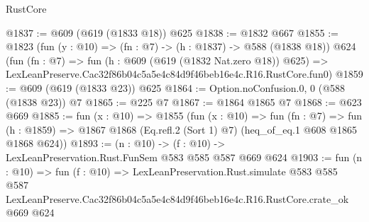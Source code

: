 \begin{lexlean}{RustCore}
\begin{coremodule}
@1837 := @609 (@619 (@1833 @18)) @625
@1838 := @1832 @667
@1855 := @1823
    (fun (y : @10) => (fn : @7) -> (h : @1837) -> @588 (@1838 @18))
    @624
    (fun (fn : @7) =>
    fun (h : @609 (@619 (@1832 Nat.zero @18)) @625) =>
    LexLeanPreserve.Cac32f86b04c5a5e4c84d9f46beb16e4c.R16.RustCore.fun0)
@1859 := @609 (@619 (@1833 @23)) @625
@1864 := Option.noConfusion.{0, 0} (@588 (@1838 @23)) @7
@1865 := @225 @7
@1867 := @1864 @1865 @7
@1868 := @623 @669
@1885 := fun (x : @10) =>
  @1855
    (fun (x : @10) =>
    fun (fn : @7) =>
    fun (h : @1859) => @1867 @1868 (Eq.refl.{2} (Sort 1) @7) (heq_of_eq.{1} @608 @1865 @1868 @624))
@1893 := (n : @10) -> (f : @10) -> LexLeanPreservation.Rust.FunSem @583 @585 @587 @669 @624
@1903 := fun (n : @10) =>
  fun (f : @10) =>
  LexLeanPreservation.Rust.simulate
    @583
    @585
    @587
    LexLeanPreserve.Cac32f86b04c5a5e4c84d9f46beb16e4c.R16.RustCore.crate_ok
    @669
    @624
\end{coremodule}
\end{lexlean}
